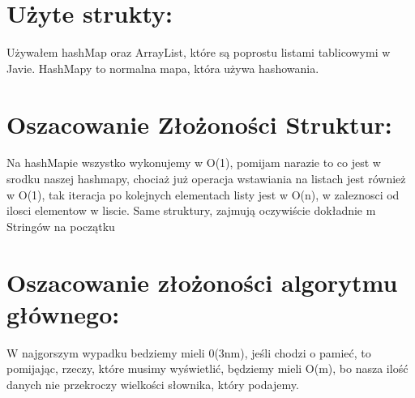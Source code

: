 \documentclass[12pt]{article}
\begin{document}
\section{Użyte strukty:}
Używałem hashMap oraz ArrayList, które są poprostu listami tablicowymi w Javie. HashMapy to normalna mapa, która używa hashowania.
\section{Oszacowanie Złożoności Struktur: }
Na hashMapie wszystko wykonujemy w O(1), pomijam narazie to co jest w srodku naszej hashmapy, chociaż już operacja wstawiania na listach jest również w O(1), tak iteracja po kolejnych elementach listy jest w O(n), w zaleznosci od ilosci elementow w liscie. Same struktury, zajmują oczywiście dokładnie m Stringów na początku
\section{Oszacowanie złożoności algorytmu głównego:}
W najgorszym wypadku bedziemy mieli 0(3nm), jeśli chodzi o pamieć, to pomijając, rzeczy, które musimy wyświetlić, będziemy mieli O(m), bo nasza ilość danych nie przekroczy wielkości słownika, który podajemy.
\end{document}
